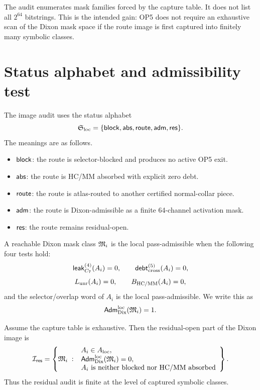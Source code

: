 \begin{remark}
The audit enumerates mask families forced by the capture table. It does not list all \(2^{64}\) bitstrings. This is the intended gain: OP5 does not require an exhaustive scan of the Dixon mask space if the route image is first captured into finitely many symbolic classes.
\end{remark}

\section{Status alphabet and admissibility test}

\begin{definition}
The image audit uses the status alphabet
\[
\mathfrak S_{\mathrm{loc}}
=
\{\mathsf{block},\mathsf{abs},\mathsf{route},\mathsf{adm},\mathsf{res}\}.
\]
The meanings are as follows.
\begin{itemize}[leftmargin=2em]
\item \(\mathsf{block}\): the route is selector-blocked and produces no active OP5 exit.
\item \(\mathsf{abs}\): the route is HC/MM absorbed with explicit zero debt.
\item \(\mathsf{route}\): the route is atlas-routed to another certified normal-collar piece.
\item \(\mathsf{adm}\): the route is Dixon-admissible as a finite 64-channel activation mask.
\item \(\mathsf{res}\): the route remains residual-open.
\end{itemize}
\end{definition}

\begin{definition}
A reachable Dixon mask class \(\mathfrak M_i\) is the local pass-admissible when the following four tests hold:
\[
\mathsf{leak}_{C_7}^{(4)}(A_i)=0,
\qquad
\mathsf{debt}_{\mathrm{cross}}^{(5)}(A_i)=0,
\]
\[
L_{\mathrm{unr}}(A_i)=0,
\qquad
B_{\mathrm{HC}/\mathrm{MM}}(A_i)=0,
\]
and the selector/overlap word of \(A_i\) is the local pass-admissible. We write this as
\[
\mathsf{Adm}_{\mathrm{Dix}}^{\mathrm{loc}}(\mathfrak M_i)=1.
\]
\end{definition}

\begin{lemma}
Assume the capture table is exhaustive. Then the residual-open part of the Dixon image is
\[
\mathcal I_{\mathsf{res}}
=
\left\{\mathfrak M_i\;:\;
\begin{array}{l}
A_i\in A_{\mathrm{loc}},\\
\mathsf{Adm}_{\mathrm{Dix}}^{\mathrm{loc}}(\mathfrak M_i)=0,\\
A_i\text{ is neither blocked nor HC/MM absorbed}
\end{array}
\right\}.
\]
Thus the residual audit is finite at the level of captured symbolic classes.
\end{lemma}

